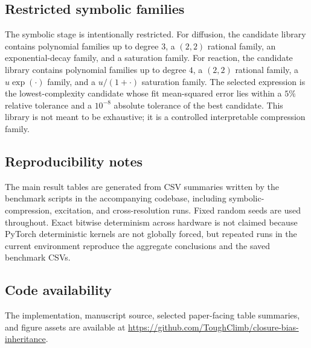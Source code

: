 \documentclass[preprint,12pt]{elsarticle}
\newcommand{\codeurl}{\url{https://github.com/ToughClimb/closure-bias-inheritance}}
\begin{document}
\subsection{Restricted symbolic families}

The symbolic stage is intentionally restricted. For diffusion, the candidate library contains polynomial families up to degree $3$, a $(2,2)$ rational family, an exponential-decay family, and a saturation family. For reaction, the candidate library contains polynomial families up to degree $4$, a $(2,2)$ rational family, a $u\exp(\cdot)$ family, and a $u/(1+\cdot)$ saturation family. The selected expression is the lowest-complexity candidate whose fit mean-squared error lies within a $5\%$ relative tolerance and a $10^{-8}$ absolute tolerance of the best candidate. This library is not meant to be exhaustive; it is a controlled interpretable compression family.

\subsection{Reproducibility notes}

The main result tables are generated from CSV summaries written by the benchmark scripts in the accompanying codebase, including symbolic-compression, excitation, and cross-resolution runs. Fixed random seeds are used throughout. Exact bitwise determinism across hardware is not claimed because PyTorch deterministic kernels are not globally forced, but repeated runs in the current environment reproduce the aggregate conclusions and the saved benchmark CSVs.

\subsection{Code availability}

The implementation, manuscript source, selected paper-facing table summaries, and figure assets are available at \codeurl.
\end{document}
